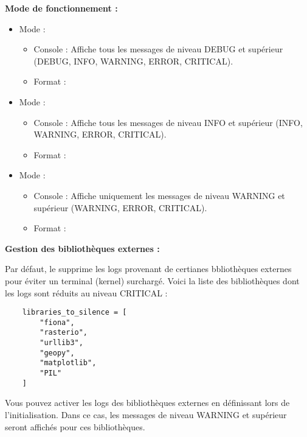 \noindent\textbf{Mode de fonctionnement :}
\begin{itemize}[leftmargin=1.5cm]
    \item Mode  :
    \begin{itemize}
        \item Console : Affiche tous les messages de niveau DEBUG et supérieur (DEBUG, INFO, WARNING, ERROR, CRITICAL).
        \item Format : 
    \end{itemize}
    \item Mode  :
    \begin{itemize}
        \item Console : Affiche tous les messages de niveau INFO et supérieur (INFO, WARNING, ERROR, CRITICAL).
        \item Format : 
    \end{itemize}
    \item Mode  :
    \begin{itemize}
        \item Console : Affiche uniquement les messages de niveau WARNING et supérieur (WARNING, ERROR, CRITICAL).
        \item Format : 
    \end{itemize}
\end{itemize}

\vspace{1em}

\noindent\textbf{Gestion des bibliothèques externes :}

Par défaut, le  supprime les logs provenant de certianes bbliothèques externes pour éviter un terminal (kernel) surchargé. Voici la liste des bibliothèques dont les logs sont réduits au niveau CRITICAL :

\begin{verbatim}
    libraries_to_silence = [
        "fiona",
        "rasterio",
        "urllib3",
        "geopy",
        "matplotlib",
        "PIL"
    ]
\end{verbatim}

Vous pouvez activer les logs des bibliothèques externes en définissant  lors de l'initialisation. Dans ce cas, les messages de niveau WARNING et supérieur seront affichés pour ces bibliothèques.

